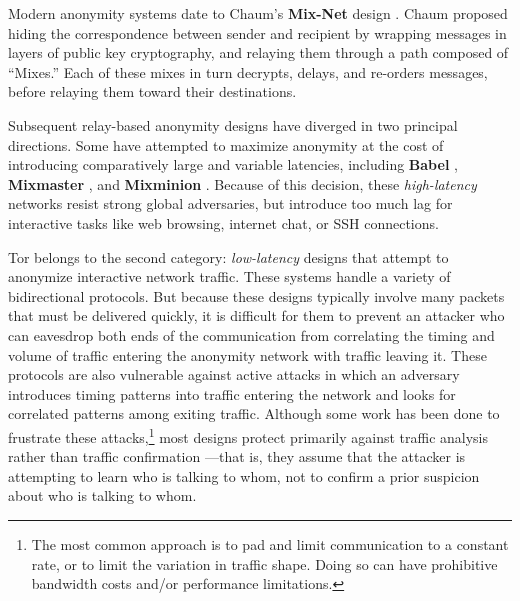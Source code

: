 \documentclass[times,10pt,twocolumn]{article}
\begin{document}

\label{sec:related-work}

Modern anonymity systems date to Chaum's {\bf Mix-Net} design
\cite{chaum-mix}. Chaum
proposed hiding the correspondence between sender and recipient by
wrapping messages in layers of public key cryptography, and relaying them
through a path composed of ``Mixes.''  Each of these mixes in turn
decrypts, delays, and re-orders messages, before relaying them toward
their destinations.

Subsequent relay-based anonymity designs have diverged in two
principal directions.  Some have attempted to maximize anonymity at
the cost of introducing comparatively large and variable latencies,
including {\bf Babel} \cite{babel}, {\bf Mixmaster}
\cite{mixmaster-spec}, and
{\bf Mixminion} \cite{minion-design}.  Because of this
decision, these \emph{high-latency} networks resist strong global
adversaries,
but introduce too much lag for interactive tasks like web browsing,
internet chat, or SSH connections.

Tor belongs to the second category: \emph{low-latency} designs that
attempt to anonymize interactive network traffic. These systems handle
a variety of bidirectional protocols.
But because these designs typically
involve many packets that must be delivered quickly, it is
difficult for them to prevent an attacker who can eavesdrop both ends of the
communication from correlating the timing and volume
of traffic entering the anonymity network with traffic leaving it.  These
protocols are also vulnerable against active attacks in which an
adversary introduces timing patterns into traffic entering the network and 
looks
for correlated patterns among exiting traffic.
Although some work has been done to frustrate
these attacks,\footnote{
  The most common approach is to pad and limit communication to a constant
  rate, or to limit
  the variation in traffic shape.  Doing so can have prohibitive bandwidth
  costs and/or performance limitations.
} most designs protect primarily against traffic analysis rather than traffic
confirmation \cite{or-jsac98}---that is, they assume that the attacker is
attempting to learn who is talking to whom, not to confirm a prior suspicion
about who is talking to whom.
\end{document}

